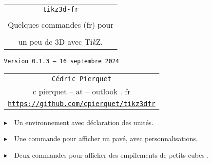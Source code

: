 \documentclass[french,a4paper,11pt]{article}
\def\TPversion{0.1.3}
\def\TPdate{16 septembre 2024}
\providecommand\tikzlogo{Ti\textit{k}Z}
\let\TikZ\tikzlogo
\begin{document}
\setlength{\aweboxleftmargin}{0.07\linewidth}
\setlength{\aweboxcontentwidth}{0.93\linewidth}
\setlength{\aweboxvskip}{8pt}

\pagestyle{fancy}

\thispagestyle{empty}

\vspace{2cm}

\begin{center}
	\begin{minipage}{0.75\linewidth}
	\begin{tcolorbox}[colframe=yellow,colback=yellow!15]
		\begin{center}
			\begin{tabular}{c}
				{\Huge \texttt{tikz3d-fr}}\\
				\\
				{\LARGE Quelques commandes (fr) pour} \\
				\\
				{\LARGE un peu de 3D avec \TikZ.} \\
			\end{tabular}
			
			\bigskip
			
			{\small \texttt{Version \TPversion{} -- \TPdate}}
		\end{center}
	\end{tcolorbox}
\end{minipage}
\end{center}

\begin{center}
	\begin{tabular}{c}
	\texttt{Cédric Pierquet}\\
	{\ttfamily c pierquet -- at -- outlook . fr}\\
	\texttt{\url{https://github.com/cpierquet/tikz3dfr}}
\end{tabular}
\end{center}

\vspace{0.25cm}

{$\blacktriangleright$~~Un environnement avec déclaration des unités.}

\smallskip

{$\blacktriangleright$~~Une commande pour afficher un pavé, avec personnalisations.}

\smallskip

{$\blacktriangleright$~~Deux commandes pour afficher des empilements de \og petits cubes \fg.}

\vspace{1cm}
\end{document}
